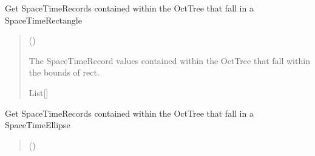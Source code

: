 \documentclass[letterpaper,10pt,english]{sphinxmanual}
\begin{document}
\begin{fulllineitems}
\begin{fulllineitems}
\end{fulllineitems}


\begin{fulllineitems}
\label{\detokenize{octtree:GeoSpatialTools.octtree.OctTree.query}}
\pysigstartsignatures
\pysiglinewithargsret
{}
{\sphinxparamcomma {}}
{}
\pysigstopsignatures
\sphinxAtStartPar
Get SpaceTimeRecords contained within the OctTree that fall in a
SpaceTimeRectangle
\begin{quote}\begin{description}
\sphinxAtStartPar
{} ({\hyperref[\detokenize{shape:GeoSpatialTools.shape.SpaceTimeRectangle}]{}})

\sphinxAtStartPar
The SpaceTimeRecord values contained within the OctTree that fall
within the bounds of rect.

\sphinxAtStartPar
List{[}{\hyperref[\detokenize{record:GeoSpatialTools.record.SpaceTimeRecord}]{}}{]}

\end{description}\end{quote}

\end{fulllineitems}


\begin{fulllineitems}
\label{\detokenize{octtree:GeoSpatialTools.octtree.OctTree.query_ellipse}}
\pysigstartsignatures
\pysiglinewithargsret
{}
{\sphinxparamcomma {}}
{}
\pysigstopsignatures
\sphinxAtStartPar
Get SpaceTimeRecords contained within the OctTree that fall in a
SpaceTimeEllipse
\begin{quote}\begin{description}
\sphinxAtStartPar
{} ({\hyperref[\detokenize{shape:GeoSpatialTools.shape.SpaceTimeEllipse}]{}})


\end{description}
\end{quote}
\end{fulllineitems}
\end{fulllineitems}
\end{document}
